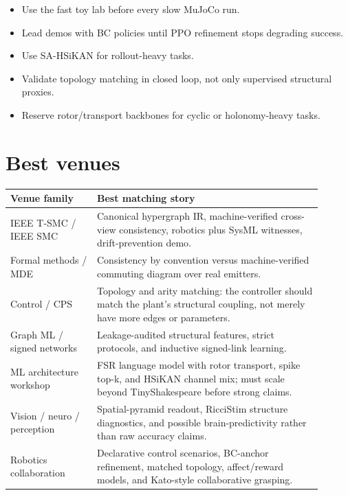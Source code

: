 \documentclass[11pt]{article}
\begin{document}
\begin{itemize}[nosep]
  \item Use the fast toy lab before every slow MuJoCo run.
  \item Lead demos with BC policies until PPO refinement stops degrading success.
  \item Use SA-HSiKAN for rollout-heavy tasks.
  \item Validate topology matching in closed loop, not only supervised structural
  proxies.
  \item Reserve rotor/transport backbones for cyclic or holonomy-heavy tasks.
\end{itemize}

\section{Best venues}

\begin{table}[h]\centering\small
\begin{tabular}{p{0.25\linewidth}p{0.65\linewidth}}
\toprule
Venue family & Best matching story \\
\midrule
IEEE T-SMC / IEEE SMC & Canonical hypergraph IR, machine-verified cross-view
consistency, robotics plus SysML witnesses, drift-prevention demo. \\
Formal methods / MDE & Consistency by convention versus machine-verified
commuting diagram over real emitters. \\
Control / CPS & Topology and arity matching: the controller should match the
plant's structural coupling, not merely have more edges or parameters. \\
Graph ML / signed networks & Leakage-audited structural features, strict
protocols, and inductive signed-link learning. \\
ML architecture workshop & FSR language model with rotor transport, spike top-k,
and HSiKAN channel mix; must scale beyond TinyShakespeare before strong claims. \\
Vision / neuro / perception & Spatial-pyramid readout, RicciStim structure
diagnostics, and possible brain-predictivity rather than raw accuracy claims. \\
Robotics collaboration & Declarative control scenarios, BC-anchor refinement,
matched topology, affect/reward models, and Kato-style collaborative grasping. \\
\bottomrule
\end{tabular}
\end{table}
\end{document}
